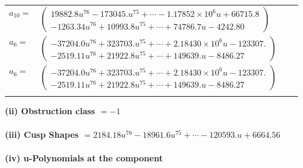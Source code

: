 \documentclass[1p]{elsarticle_modified}
\theoremstyle{definition}
\begin{document}
\begin{tabular}{m{7pt} m{180pt} m{7pt} m{180pt} }
\flushright $a_{10}=$&$\begin{pmatrix}19882.8 u^{76}-173045. u^{75}+\cdots-1.17852\times10^{6} u+66715.8\\-1263.34 u^{76}+10993.8 u^{75}+\cdots+74786.7 u-4242.80\end{pmatrix}$ \\
\flushright $a_{6}=$&$\begin{pmatrix}-37204.0 u^{76}+323703. u^{75}+\cdots+2.18430\times10^{6} u-123307.\\-2519.11 u^{76}+21922.8 u^{75}+\cdots+149639. u-8486.27\end{pmatrix}$\\ \flushright $a_{6}=$&$\begin{pmatrix}-37204.0 u^{76}+323703. u^{75}+\cdots+2.18430\times10^{6} u-123307.\\-2519.11 u^{76}+21922.8 u^{75}+\cdots+149639. u-8486.27\end{pmatrix}$\\&\end{tabular}
\flushleft \textbf{(ii) Obstruction class $= -1$}\\~\\
\flushleft \textbf{(iii) Cusp Shapes $= 2184.18 u^{76}-18961.6 u^{75}+\cdots-120593. u+6664.56$}\\~\\
\newpage\renewcommand{\arraystretch}{1}
\flushleft \textbf{(iv) u-Polynomials at the component}\newline \\
\end{document}

